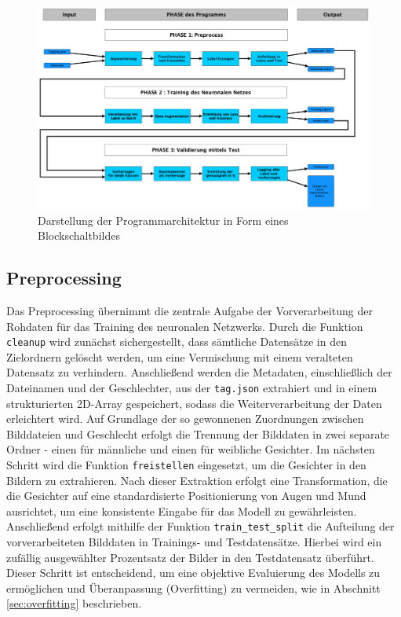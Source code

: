 \documentclass[journal,twoside,web]{ieeecolor}
\begin{document}
\begin{figure}[!t]
    \centerline{\includegraphics[width=\columnwidth]{Architektur.png}}
    \caption{Darstellung der Programmarchitektur in Form eines Blockschaltbildes}
    \label{fig:architecture}
\end{figure}

\subsection{Preprocessing}
Das Preprocessing übernimmt die zentrale Aufgabe der Vorverarbeitung der Rohdaten für das Training des neuronalen Netzwerks.
Durch die Funktion \texttt{cleanup} wird zunächst sichergestellt, dass sämtliche Datensätze in den Zielordnern gelöscht werden, um eine Vermischung mit einem veralteten Datensatz zu verhindern.
Anschließend werden die Metadaten, einschließlich der Dateinamen und der Geschlechter, aus der \texttt{tag.json} extrahiert und in einem strukturierten 2D-Array gespeichert, sodass die Weiterverarbeitung der Daten erleichtert wird.
Auf Grundlage der so gewonnenen Zuordnungen zwischen Bilddateien und Geschlecht erfolgt die Trennung der Bilddaten in zwei separate Ordner - einen für männliche und einen für weibliche Gesichter.
Im nächsten Schritt wird die Funktion \texttt{freistellen} eingesetzt, um die Gesichter in den Bildern zu extrahieren.
Nach dieser Extraktion erfolgt eine Transformation, die die Gesichter auf eine standardisierte Positionierung von Augen und Mund ausrichtet, um eine konsistente Eingabe für das Modell zu gewährleisten.
Anschließend erfolgt mithilfe der Funktion \texttt{train\_test\_split} die Aufteilung der vorverarbeiteten Bilddaten in Trainings- und Testdatensätze.
Hierbei wird ein zufällig ausgewählter Prozentsatz der Bilder in den Testdatensatz überführt.
Dieser Schritt ist entscheidend, um eine objektive Evaluierung des Modells zu ermöglichen und Überanpassung (Overfitting) zu vermeiden, wie in Abschnitt \ref{sec:overfitting} beschrieben.
\end{document}

